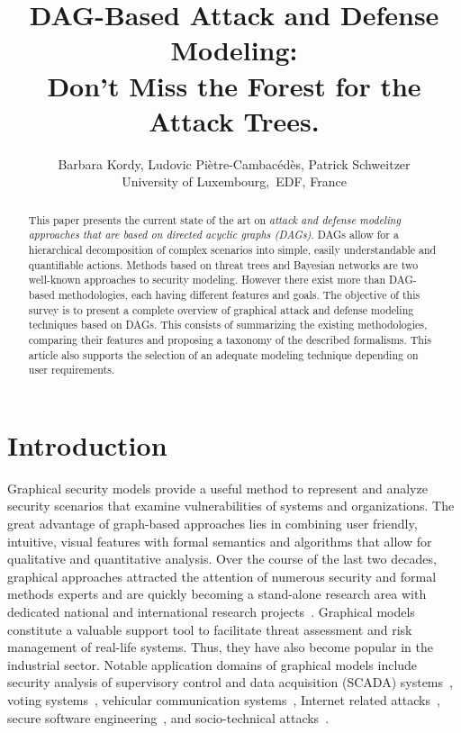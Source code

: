 \documentclass[a4paper]{article}
\author{
Barbara Kordy,
Ludovic Pi\`{e}tre-Cambac\'{e}d\`{e}s,
Patrick Schweitzer
\\
University of Luxembourg,~EDF, France
\date{}
}
\title{DAG-Based Attack and Defense Modeling:\\
Don't Miss the Forest for the Attack Trees.\footnotemark[1]}
\begin{document}
\maketitle

\begin{abstract}
This paper presents the current state of the art on \emph{attack and defense
modeling approaches that are based on directed acyclic graphs (DAGs)}. DAGs
allow for a hierarchical decomposition of complex scenarios into simple, easily
understandable and quantifiable actions. Methods based on threat trees and
Bayesian networks are two well-known approaches to security modeling. However
there exist more than   DAG-based methodologies, each having different
features and goals. The objective of this survey is to present a complete
overview of  graphical attack and defense modeling techniques based on DAGs.
This consists  of summarizing the existing methodologies, comparing their
features  and proposing a taxonomy of the  described formalisms. This article
also  supports the selection of an adequate modeling technique depending on
user requirements. 
\end{abstract}

\renewcommand*{\thefootnote}{\fnsymbol{footnote}}
\renewcommand*{\thefootnote}{\arabic{footnote}}

\section{Introduction} 

Graphical security models provide a useful method to represent and analyze 
security scenarios that examine vulnerabilities of systems and organizations.
The great advantage of graph-based approaches lies in combining user friendly,
intuitive, visual  features with formal  semantics and algorithms that allow for
qualitative and quantitative analysis. Over the course of the last two decades,
graphical approaches attracted the attention of numerous security and formal
methods experts and are quickly becoming a stand-alone research area  with
dedicated national and international research 
projects~\cite{Website_SHIELDS,trespass,aniketos,ATREES,VISPER}. Graphical 
models constitute a valuable support tool to facilitate threat assessment and
risk management of real-life systems.  Thus, they have also become popular in
the industrial sector. Notable application domains of graphical models include
security analysis of supervisory control and data acquisition (SCADA)
systems~\cite{ByFrMi,TeLiGo,TaJo}, voting systems~\cite{LaDiEpHa,BuTr},
vehicular communication systems~\cite{HeApFuRoRuWe,AiBoDoFeGeKrLe}, Internet
related attacks~\cite{TiLaFiHa,LiZaRuLi}, secure software
engineering~\cite{JuElBaRa}, and socio-technical
attacks~\cite{BaKoMeSc,EoPaPaCh,ReVeOlCu}.
\end{document}

